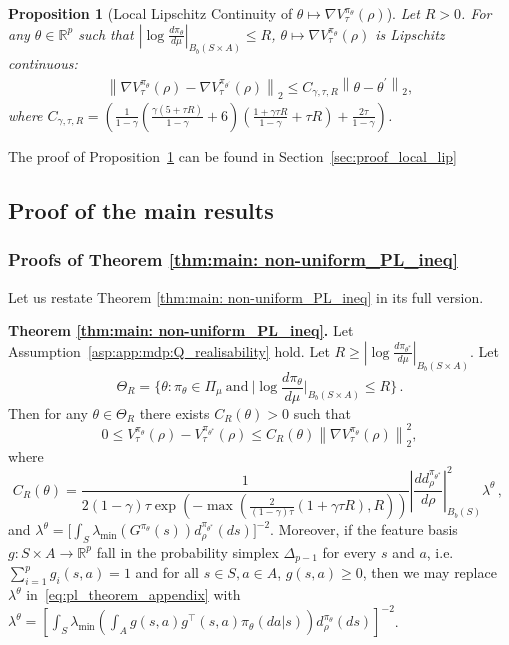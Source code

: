 \documentclass{amsart}
\newtheorem{proposition}{Proposition}
\theoremstyle{definition}
\begin{document}
\begin{proposition}[Local Lipschitz Continuity of  $\theta \mapsto \nabla V_\tau^{\pi_\theta}(\rho)$]\label{prp:app:mdp:local_lipchitiz_conitinuity_mdp}
Let $R >0$.
For any $\theta \in \mathbb R^p$ such that $\left|\log \frac{d \pi_\theta}{d\mu}\right|_{B_b(S \times A)} \leq R$, $\theta \mapsto \nabla V_\tau^{\pi_\theta}(\rho)$ is Lipschitz continuous:
\begin{align*}
\left\|\nabla V_\tau^{\pi_\theta}(\rho) - \nabla V_\tau^{\pi_{\theta^\prime}}(\rho)\right\|_2 
\leq  C_{\gamma,\tau,R} \left\|\theta - \theta^\prime\right\|_2,
\end{align*}
where $C_{\gamma,\tau,R} = \left( \frac{1}{1-\gamma}\left(\frac{ \gamma (5 + \tau R)  }{1-\gamma} + 6\right)\left(\frac{1+\gamma\tau R}{1-\gamma} + \tau R\right) + \frac{2\tau }{1-\gamma}\right)$.
\end{proposition}
The proof of Proposition~\ref{prp:app:mdp:local_lipchitiz_conitinuity_mdp} can be found in Section~\ref{sec:proof_local_lip}

\subsection{Proof of the main results}
\label{sec:proof}

\subsubsection{Proofs of Theorem \ref{thm:main: non-uniform_PL_ineq}}
\label{sec:pf_non_uniform_PL}
Let us restate Theorem \ref{thm:main: non-uniform_PL_ineq} in its full version.


\textbf{Theorem \ref{thm:main: non-uniform_PL_ineq}.}
Let Assumption~\ref{asp:app:mdp:Q_realisability} hold.
Let $R \geq |\log \frac{d \pi_{\theta^\ast}}{d\mu}|_{B_b(S\times A)}$.
Let
\[
\Theta_R = \{\theta: \pi_\theta \in \Pi_\mu \ \text{and}\  \vert \log \frac{d \pi_\theta}{d\mu}\vert_{B_b(S\times A)} \leq R \}\,.
\]
Then for any $\theta \in \Theta_R$ there exists $C_R(\theta)>0$ such that
\begin{equation}
\label{eq:pl_theorem_appendix}
0 \leq V_\tau^{\pi_\theta}(\rho) - V_\tau^{\pi_{\theta^*}}(\rho) \leq C_R(\theta)\left\|\nabla V_\tau^{\pi_\theta}(\rho)\right\|^2_2,
\end{equation}
where 
\[
C_R(\theta) = \frac{1}{2(1-\gamma)\tau \exp\left({-\max\left(\frac{2}{(1-\gamma)\tau} \left(1+\gamma\tau R\right), R\right)}\right)}\left|\frac{d d_\rho^{\pi_{\theta^*}}}{ d \rho}\right|^2_{B_b(S)} \lambda^{\theta}\, , \ \label{eq:non_uni_PL_cons_affine}
\]
and
$
\lambda^{\theta} = \bigg[\int_S \lambda_{\min}(G^{\pi_\theta}(s))d_\rho^{\pi_{\theta^*}}(ds)\bigg]^{-2}.
$
Moreover, if the feature basis $g:S\times A \to \mathbb R^p$ fall in the probability simplex $\Delta_{p-1}$ for every $s$ and $a$, i.e. $\sum_{i=1}^p g_i(s,a) = 1 $ and for all $s \in S,a \in A$, $g(s,a) \geq 0$, then we may replace $\lambda^\theta$ in~\eqref{eq:pl_theorem_appendix} with
$\lambda^{\theta} = \left[\int_{S}\lambda_{\min}\left(\int_{A} g(s,a)g^\top(s,a)\pi_\theta(da|s)\right)d^{\pi_{\theta}}_{\rho}(ds)\right]^{-2}$.
\end{document}
